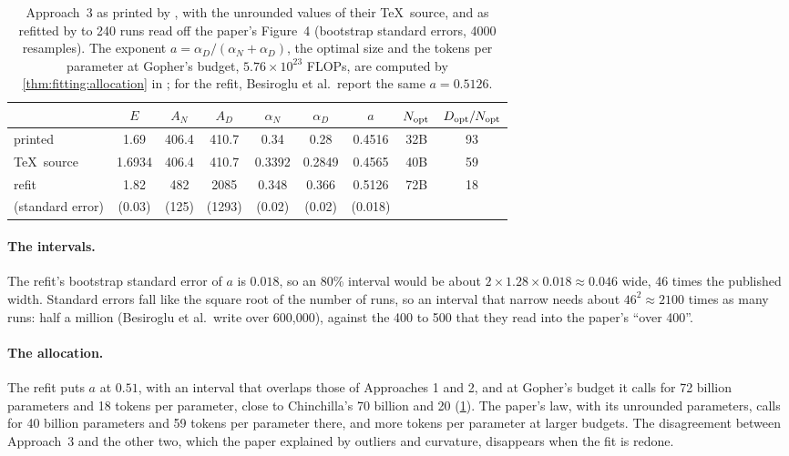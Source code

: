 \begin{refsection}
\begin{table}[t]
\begin{fullwidth}
\centering\small
\begin{tabular}{@{}l*{6}{c}cc@{}}
\toprule
& $E$ & $A_N$ & $A_D$ & $\alpha_N$ & $\alpha_D$ & $a$ & $N_{\mathrm{opt}}$ & $D_{\mathrm{opt}}/N_{\mathrm{opt}}$\\
\midrule
printed & 1.69 & 406.4 & 410.7 & 0.34 & 0.28 & 0.4516 & 32B & 93\\
\TeX\ source & 1.6934 & 406.4 & 410.7 & 0.3392 & 0.2849 & 0.4565 & 40B & 59\\
refit & 1.82 & 482 & 2085 & 0.348 & 0.366 & 0.5126 & 72B & 18\\
(standard error) & (0.03) & (125) & (1293) & (0.02) & (0.02) & (0.018) & & \\
\bottomrule
\end{tabular}
\caption{Approach~3 as printed by \textcite{HoffmannEtAl2022}, with the unrounded values of their \TeX\ source, and as refitted by \textcite{BesirogluEtAl2024} to 240 runs read off the paper's Figure~4 (bootstrap standard errors, 4000 resamples). The exponent $a=\alpha_D/(\alpha_N+\alpha_D)$, the optimal size and the tokens per parameter at Gopher's budget, $5.76\times10^{23}$ FLOPs, are computed by \cref{thm:fitting:allocation} in ; for the refit, Besiroglu et al.\ report the same $a=0.5126$.}
\label{tab:fitting:estimates}
\end{fullwidth}
\end{table}

\paragraph{The intervals.} The refit's bootstrap standard error of $a$ is $0.018$, so an 80\% interval would be about $2\times1.28\times0.018\approx0.046$ wide, 46 times the published width. Standard errors fall like the square root of the number of runs, so an interval that narrow needs about $46^2\approx2100$ times as many runs: half a million (Besiroglu et al.\ write over 600,000), against the 400 to 500 that they read into the paper's ``over 400''.

\paragraph{The allocation.} The refit puts $a$ at $0.51$, with an interval that overlaps those of Approaches 1 and 2, and at Gopher's budget it calls for 72 billion parameters and 18 tokens per parameter, close to Chinchilla's 70 billion and 20 (\cref{tab:fitting:estimates}). The paper's law, with its unrounded parameters, calls for 40 billion parameters and 59 tokens per parameter there, and more tokens per parameter at larger budgets. The disagreement between Approach~3 and the other two, which the paper explained by outliers and curvature, disappears when the fit is redone.


\end{refsection}
